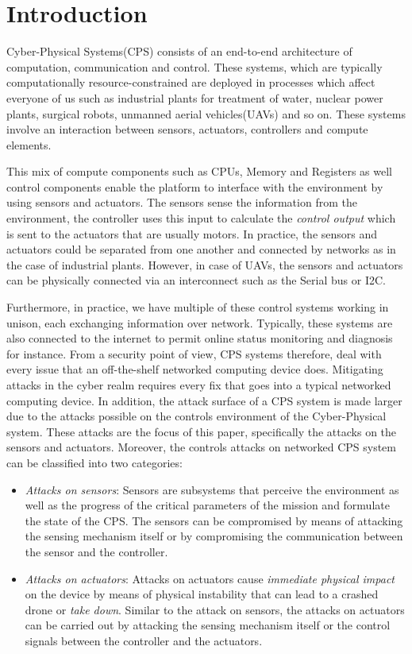 \section{Introduction}
Cyber-Physical Systems(CPS) consists of an end-to-end architecture of computation, communication and control. These systems, which are typically computationally resource-constrained are deployed in processes which affect everyone of us such as industrial plants for treatment of water, nuclear power plants, surgical robots, unmanned aerial vehicles(UAVs) and so on. These systems involve an interaction between sensors, actuators, controllers and compute elements.

This mix of compute components such as CPUs, Memory and Registers as well control components enable the platform to interface with the environment by using sensors and actuators. The sensors sense the information from the environment, the controller uses this input to calculate the \textit{control output} which is sent to the actuators that are usually motors. In practice, the sensors and actuators could be separated from one another and connected by networks as in the case of industrial plants. However, in case of UAVs, the sensors and actuators can be physically connected via an interconnect such as the Serial bus or I2C.

Furthermore, in practice, we have multiple of these control systems working in unison, each exchanging information over network. Typically, these systems are also connected to the internet to permit online status monitoring and diagnosis for instance. From a security point of view, CPS systems therefore, deal with every issue that an off-the-shelf networked computing device does. Mitigating attacks in the cyber realm requires every fix that goes into a typical networked computing device. In addition, the attack surface of a CPS system is made larger due to the attacks possible on the controls environment of the Cyber-Physical system. These attacks are the focus of this paper, specifically the attacks on the sensors and actuators. Moreover, the controls attacks on networked CPS system can be classified into two categories:

\begin{itemize}
    \item \textit{Attacks on sensors}: Sensors are subsystems that perceive the environment as well as the progress of the critical parameters of the mission and formulate the state of the CPS. The sensors can be compromised by means of attacking the sensing mechanism itself or by compromising the communication between the sensor and the controller.
    
    \item \textit{Attacks on actuators}: Attacks on actuators cause \textit{immediate physical impact} on the device by means of physical instability that can lead to a crashed drone or \textit{take down}. Similar to the attack on sensors, the attacks on actuators can be carried out by attacking the sensing mechanism itself or the control signals between the controller and the actuators.
    
\end{itemize}

